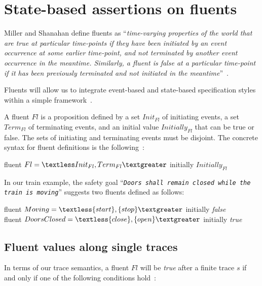 \section{State-based assertions on fluents\label{section:background-fluents}}

Miller and Shanahan define fluents as ``\emph{time-varying properties of the world that are true at particular time-points if they have been initiated by an event occurrence at some earlier time-point, and not terminated by another event occurrence in the meantime. Similarly, a fluent is false at a particular time-point if it has been previously terminated and not initiated in the meantime}''~\cite{Miller:2002}.

Fluents will allow us to integrate event-based and state-based specification styles within a simple framework~\cite{Giannakopoulou:2003}. 

A fluent $Fl$ is a proposition defined by a set $Init_{Fl}$ of initiating events, a set $Term_{Fl}$ of terminating events, and an initial value $Initially_{Fl}$ that can be true or false. The sets of initiating and terminating events must be disjoint. The concrete syntax for fluent definitions is the following~\cite{Giannakopoulou:2003}:

\begin{center}
fluent $Fl = \textless Init_{Fl}, Term_{Fl} \textgreater $ initially $Initially_{Fl}$
\end{center}

In our train example, the safety goal ``\emph{\texttt{Doors shall remain closed while the train is moving}}'' suggests two fluents defined as follows:

\begin{center}
fluent $Moving = \textless \{start\}, \{stop\} \textgreater $ initially \emph{false} \\
fluent $DoorsClosed = \textless \{close\}, \{open\} \textgreater $ initially \emph{true} \\
\end{center}

\subsection{Fluent values along single traces\label{subsection:background-fluents-single-traces}}

In terms of our trace semantics, a fluent $Fl$ will be \emph{true} after a finite trace $s$ if and only if one of the following conditions hold~\cite{Giannakopoulou:2003}:

